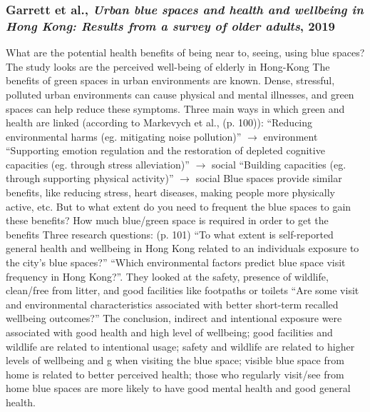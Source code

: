 \documentclass{article}
\begin{document}
\subsubsection{Garrett et al., \textit{Urban blue spaces and health and wellbeing in Hong Kong: Results from a survey of older adults}, 2019} \parencite{garrett2019urban}

\begin{outline}
	\1 What are the potential health benefits of being near to, seeing, using blue spaces? The study looks are the perceived well-being of elderly in Hong-Kong
	\1 The benefits of green spaces in urban environments are known. Dense, stressful, polluted urban environments can cause physical and mental illnesses, and green spaces can help reduce these symptoms. Three main ways in which green and health are linked (according to Markevych et al., (p. 100)):
		\2 ``Reducing environmental harms (eg. mitigating noise pollution)'' $\rightarrow$ environment
		\2 ``Supporting emotion regulation and the restoration of depleted cognitive capacities (eg. through stress alleviation)'' $\rightarrow$ social
		\2 ``Building capacities (eg. through supporting physical activity)'' $\rightarrow$ social
	\1 Blue spaces provide similar benefits, like reducing stress, heart diseases, making people more physically active, etc. But to what extent do you need to frequent the blue spaces to gain these benefits? How much blue/green space is required in order to get the benefits
	\1 Three research questions: (p. 101)
		\2 ``To what extent is self-reported general health and wellbeing in Hong Kong related to an individuals exposure to the city's blue spaces?''
		\2 ``Which environmental factors predict blue space visit frequency in Hong Kong?''. They looked at the safety, presence of wildlife, clean/free from litter, and good facilities like footpaths or toilets
		\2 ``Are some visit and environmental characteristics associated with better short-term recalled wellbeing outcomes?''
	\1 The conclusion, indirect and intentional exposure were associated with good health and high level of wellbeing; good facilities and wildlife are related to intentional usage; safety and wildlife are related to higher levels of wellbeing and g when visiting the blue space; visible blue space from home is related to better perceived health; those who regularly visit/see from home blue spaces are more likely to have good mental health and good general health.
	

\end{outline}
\end{document}
